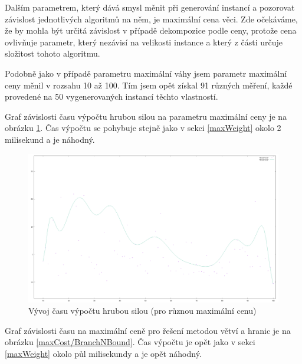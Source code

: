 \documentclass[12pt,a4paper]{article}
\begin{document}
Dalším parametrem, který dává smysl měnit při generování instancí a pozorovat závislost jednotlivých algoritmů na něm, je maximální cena věci. Zde očekáváme, že by mohla být určitá závislost v případě dekompozice podle ceny, protože cena ovlivňuje parametr, který nezávisí na velikosti instance a který z části určuje složitost tohoto algoritmu.

Podobně jako v případě parametru maximální váhy jsem parametr maximální ceny měnil v rozsahu 10 až 100. Tím jsem opět získal 91 různých měření, každé provedené na 50 vygenerovaných instancí těchto vlastností.

Graf závislosti času výpočtu hrubou silou na parametru maximální ceny je na obrázku \ref{maxCost/BruteForce}. Čas výpočtu se pohybuje stejně jako v sekci \ref{maxWeight} okolo 2 milisekund a je náhodný.

\begin{figure}[H]
\begin{center}
\includegraphics[width=\textwidth]{maxCost/BruteForce}
\caption{Vývoj času výpočtu hrubou silou (pro různou maximální cenu)}
\label{maxCost/BruteForce}
\end{center}
\end{figure}

Graf závislosti času na maximální ceně pro řešení metodou větví a hranic je na obrázku \ref{maxCost/BranchNBound}. Čas výpočtu je opět jako v sekci \ref{maxWeight} okolo půl milisekundy a je opět náhodný.
\end{document}
